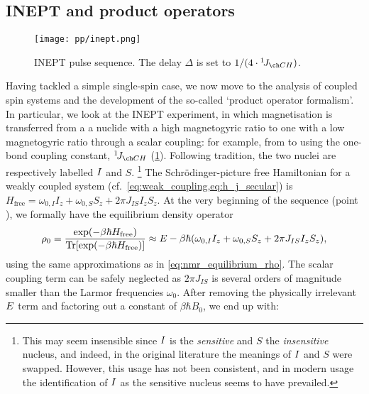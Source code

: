 \subsection{INEPT and product operators}
\label{subsec:theory__inept}

\begin{figure}[htbp]
    \centering
    \texttt{[image: pp/inept.png]}%
    \caption[INEPT pulse sequence]{
        INEPT pulse sequence.
        The delay $\Delta$ is set to $1/(4 \cdot \oneJ{CH})$.
    }
    \label{fig:inept}
\end{figure}

Having tackled a simple single-spin case, we now move to the analysis of coupled spin systems and the development of the so-called `product operator formalism'.\autocite{Sorensen1984PNMRS}
In particular, we look at the INEPT experiment\autocite{Morris1979JACS,Morris1980JACS}, in which magnetisation is transferred from a a nuclide with a high magnetogyric ratio to one with a low magnetogyric ratio through a scalar coupling: for example, from \proton{} to \carbon{} using the one-bond coupling constant, $\oneJ{CH}$ (\cref{fig:inept}).
Following tradition, the two nuclei are respectively labelled $I\/$ and $S$.%
\footnote{This may seem insensible since $I\/$ is the \textit{sensitive} and $S$ the \textit{insensitive} nucleus, and indeed, in the original literature\autocite{Morris1979JACS} the meanings of $I\/$ and $S$ were swapped. However, this usage has not been consistent\autocite{Pines1972JCP}, and in modern usage the identification of $I\/$ as the sensitive nucleus seems to have prevailed.}
The Schr\"odinger-picture free Hamiltonian for a weakly coupled system (cf.\ \cref{eq:weak_coupling,eq:h_j_secular}) is $H_\text{free} = \omega_{0,I} I_z + \omega_{0,S} S_z + 2\pi J_{IS} I_z S_z$.
At the very beginning of the sequence (point ), we formally have the equilibrium density operator
\begin{equation}
    \label{eq:density_eqm_heteronuclear_full}
    \rho_0 = \frac{\exp(-\beta\hbar H_\text{free})}{\operatorname{Tr}[\exp(-\beta\hbar H_\text{free})]}
    \approx E - \beta\hbar (\omega_{0,I} I_z + \omega_{0,S} S_z + 2\pi J_{IS} I_z S_z),
\end{equation}
using the same approximations as in \cref{eq:nmr_equilibrium_rho}.
The scalar coupling term can be safely neglected as $2\pi J_{IS}$ is several orders of magnitude smaller than the Larmor frequencies $\omega_0$.
After removing the physically irrelevant $E\/$ term and factoring out a constant of $\beta\hbar B_0$, we end up with:

